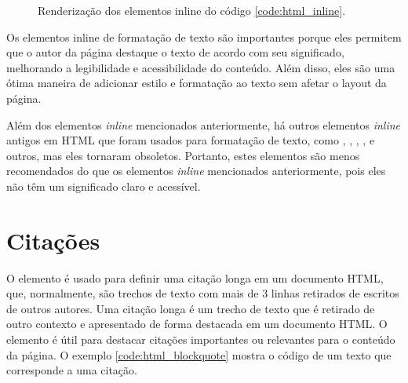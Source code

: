 \begin{figure}[ht!]    
    \caption{Renderização dos elementos inline do código \ref{code:html_inline}.}
    \label{fig:html_inline}
\end{figure}

Os elementos inline de formatação de texto são importantes porque eles permitem que o autor da página destaque o texto de acordo com seu significado, melhorando a legibilidade e acessibilidade do conteúdo. Além disso, eles são uma ótima maneira de adicionar estilo e formatação ao texto sem afetar o layout da página.

Além dos elementos \textit{inline} mencionados anteriormente, há outros elementos \textit{inline} antigos em HTML que foram usados para formatação de texto, como , , , ,  e outros, mas eles tornaram obsoletos. Portanto, estes elementos são menos recomendados do que os elementos \textit{inline} mencionados anteriormente, pois eles não têm um significado claro e acessível.

\section{Citações}

O elemento  é usado para definir uma citação longa em um documento HTML, que, normalmente, são trechos de texto com mais de 3 linhas retirados de escritos de outros autores. Uma citação longa é um trecho de texto que é retirado de outro contexto e apresentado de forma destacada em um documento HTML. O elemento  é útil para destacar citações importantes ou relevantes para o conteúdo da página. O exemplo \ref{code:html_blockquote} mostra o código de um texto que corresponde a uma citação.

